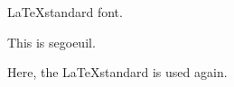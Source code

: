 \documentclass{article}
\begin{document}
\LaTeX standard font.

{\ttfsegoeuil This is segoeuil.}

Here, the \LaTeX standard is used again.
\end{document}
